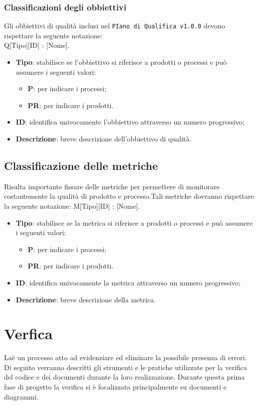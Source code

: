 \subsubsection{Classificazioni degli obbiettivi} 
Gli obbiettivi di qualità inclusi nel \texttt{PIano di Qualifica v1.0.0} devono rispettare la seguente notazione: \\
Q[Tipo][ID] : [Nome].\\
\begin{itemize}
	\item \textbf{Tipo}: stabilisce se l'obbiettivo si riferisce a prodotti o processi e può assumere i seguenti valori:
	\begin{itemize}
		\item \textbf{P}: per indicare i processi;
		\item \textbf{PR}: per indicare i prodotti.
	\end{itemize}
	\item \textbf{ID}: identifica univocamente l'obbiettivo attraverso un numero progressivo;
	\item \textbf{Descrizione}: breve descrizione dell'obbiettivo di qualità.
\end{itemize}
\subsection{Classificazione delle metriche}
Risulta importante fissare delle metriche per permettere di monitorare costantemente la qualità di prodotto e processo.Tali metriche dovranno rispettare la seguente notazione:
M[Tipo][ID] : [Nome].\\
\begin{itemize}
	\item \textbf{Tipo}: stabilisce se la metrica si riferisce a prodotti o processi e può assumere i seguenti valori:
	\begin{itemize}
		\item \textbf{P}: per indicare i processi;
		\item \textbf{PR}: per indicare i prodotti.
	\end{itemize}
	\item \textbf{ID}: identifica univocamente la metrica attraverso un numero progressivo;
	\item \textbf{Descrizione}: breve descrizione della metrica.
\end{itemize}

\section{Verfica}
Laè un processo atto ad evidenziare ed eliminare la possibile presenza di errori.
Di seguito verranno descritti gli strumenti e le pratiche utilizzate per la verifica del codice e dei documenti durante la loro realizzazione.
Durante questa prima fase di progetto la verifica si è focalizzata principalmente su documenti e diagrammi.
